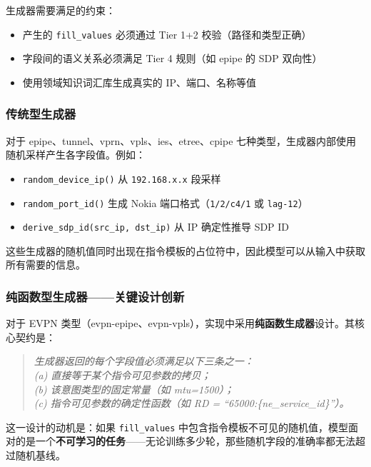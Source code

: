 \documentclass[12pt, a4paper]{article}
\newcommand{\fillvalues}{\texttt{fill\_values}}
\begin{document}
\noindent
生成器需要满足的约束：

\begin{itemize}
  \item 产生的 \fillvalues{} 必须通过 Tier 1+2 校验（路径和类型正确）
  \item 字段间的语义关系必须满足 Tier 4 规则（如 epipe 的 SDP 双向性）
  \item 使用领域知识词汇库生成真实的 IP、端口、名称等值
\end{itemize}

\subsubsection{传统型生成器}

对于 epipe、tunnel、vprn、vpls、ies、etree、cpipe 七种类型，生成器内部使用随机采样产生各字段值。例如：

\begin{itemize}
  \item \texttt{random\_device\_ip()} 从 \texttt{192.168.x.x} 段采样
  \item \texttt{random\_port\_id()} 生成 Nokia 端口格式（\texttt{1/2/c4/1} 或 \texttt{lag-12}）
  \item \texttt{derive\_sdp\_id(src\_ip, dst\_ip)} 从 IP 确定性推导 SDP ID
\end{itemize}

这些生成器的随机值同时出现在指令模板的占位符中，因此模型可以从输入中获取所有需要的信息。

\subsubsection{纯函数型生成器——关键设计创新}
\label{sec:pure-function}

对于 EVPN 类型（evpn-epipe、evpn-vpls），实现中采用\textbf{纯函数生成器}设计。其核心契约是：

\begin{quote}
\itshape
生成器返回的每个字段值必须满足以下三条之一：\\
(a) 直接等于某个指令可见参数的拷贝；\\
(b) 该意图类型的固定常量（如 mtu=1500）；\\
(c) 指令可见参数的确定性函数（如 RD = ``65000:\{ne\_service\_id\}''）。
\end{quote}

\noindent
这一设计的动机是：如果 \fillvalues{} 中包含指令模板不可见的随机值，模型面对的是一个\textbf{不可学习的任务}——无论训练多少轮，那些随机字段的准确率都无法超过随机基线。
\end{document}
